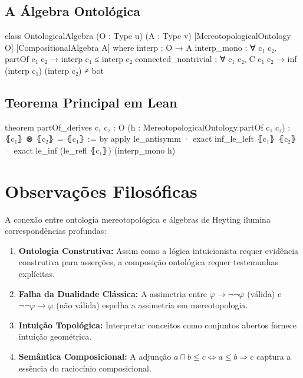 \documentclass[12pt,a4paper]{article}
\theoremstyle{definition}
\theoremstyle{plain}
\theoremstyle{remark}
\begin{document}
\subsection{A Álgebra Ontológica}

\begin{leancode}
class OntologicalAlgebra (O : Type u) (A : Type v)
    [MereotopologicalOntology O] [CompositionalAlgebra A] where
  interp : O → A
  interp_mono : ∀ {c₁ c₂}, partOf c₁ c₂ → interp c₁ ≤ interp c₂
  connected_nontrivial : ∀ {c₁ c₂}, C c₁ c₂ → 
    inf (interp c₁) (interp c₂) ≠ bot
\end{leancode}

\subsection{Teorema Principal em Lean}

\begin{leancode}
theorem partOf_derives {c₁ c₂ : O}
    (h : MereotopologicalOntology.partOf c₁ c₂) :
    ⦃c₁⦄ ⊗ ⦃c₂⦄ = ⦃c₁⦄ := by
  apply le_antisymm
  · exact inf_le_left ⦃c₁⦄ ⦃c₂⦄
  · exact le_inf (le_refl ⦃c₁⦄) (interp_mono h)
\end{leancode}

\section{Observações Filosóficas}

A conexão entre ontologia mereotopológica e álgebras de Heyting ilumina correspondências profundas:

\begin{enumerate}
  \item \textbf{Ontologia Construtiva:} Assim como a lógica intuicionista requer evidência construtiva para asserções, a composição ontológica requer testemunhas explícitas.
  
  \item \textbf{Falha da Dualidade Clássica:} A assimetria entre $\varphi \to \neg\neg\varphi$ (válida) e $\neg\neg\varphi \to \varphi$ (não válida) espelha a assimetria em mereotopologia.
  
  \item \textbf{Intuição Topológica:} Interpretar conceitos como conjuntos abertos fornece intuição geométrica.
  
  \item \textbf{Semântica Composicional:} A adjunção $a \sqcap b \leq c \Leftrightarrow a \leq b \Rightarrow c$ captura a essência do raciocínio composicional.
\end{enumerate}
\end{document}
